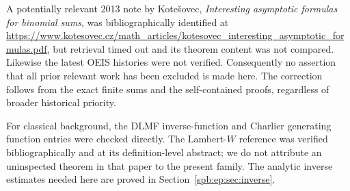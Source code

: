 A potentially relevant 2013 note by Kote\v{s}ovec,
\emph{Interesting asymptotic formulas for binomial sums}, was bibliographically
identified at
\url{https://www.kotesovec.cz/math_articles/kotesovec_interesting_asymptotic_formulas.pdf},
but retrieval timed out and its theorem content was not compared.
Likewise the latest OEIS histories were not verified.
Consequently no assertion that all prior relevant work has been excluded
is made here. The correction follows from the exact finite sums and the
self-contained proofs, regardless of broader historical priority.

For classical background, the DLMF inverse-function and Charlier generating
function entries were checked directly. The Lambert-$W$ reference was
verified bibliographically and at its definition-level abstract; we do
not attribute an uninspected theorem in that paper to the present family.
The analytic inverse estimates needed here are proved in
Section~\ref{spb:ep:sec:inverse}.

